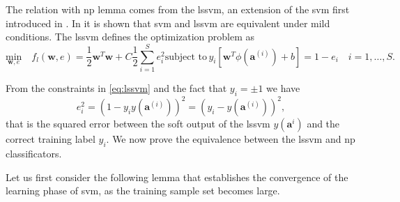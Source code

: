 \documentclass[draftcls,onecolumn,12pt]{IEEEtran}
\begin{document}

The relation with \ac{np} lemma comes from the \ac{lssvm}, an extension of the \ac{svm} first introduced in \cite{Suykens1999}. In \cite{Yevs} it is shown that  \ac{svm} and \ac{lssvm} are equivalent under mild conditions. The \ac{lssvm} defines the optimization problem as
\begin{subequations}
\label{eq:lssvm}
\begin{equation}
\label{eq:lssvmOrig}
	 \underset{\mathbf{w},e}{\text{min}} \quad f_l(\mathbf{w},e) = \frac{1}{2} \mathbf{w}^T \mathbf{w} + C \frac{1}{2} \sum_{i=1}^S e_i ^2 
\end{equation}
\begin{equation}
\label{eq:stpart}
	 \text{subject to}\,  y_i[\mathbf{w}^T \phi (\mathbf{a}^{(i)}) + b] = 1- e_i\quad i = 1 ,\dots,S.
\end{equation}
\end{subequations}

From the constraints in \eqref{eq:lssvm} and the fact that $y_i = \pm 1$ we have
\begin{equation}
\label{eq:els}
		e_i^2 = (1 - y_iy(\mathbf{a}^{(i)}) )^2 = (y_i - y(\mathbf{a}^{(i)}))^2,
\end{equation}
that is the squared error between the soft output of the \ac{lssvm} $y(\mathbf{a}^i)$ and the correct training label $y_i$. We now prove the equivalence between the \ac{lssvm} and \ac{np} classificators. 

Let us first consider the following lemma that establishes the convergence of the learning phase of \ac{svm}, as the training sample set becomes large.
\end{document}
